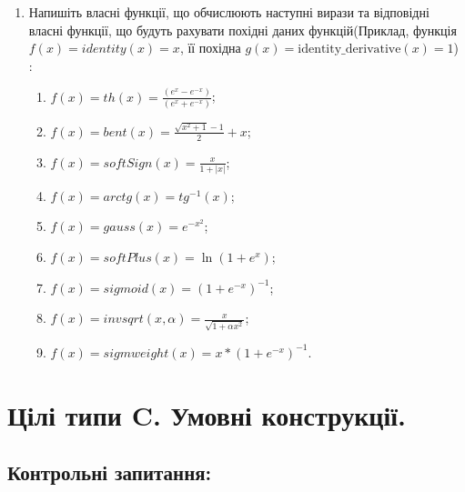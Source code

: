 \documentclass[a5paper,titlepage,openany,twoside,
]
{book_unv}%
\makeatletter
\newcommand{\xslalph}[1]{\expandafter\@xslalph\csname c@#1\endcsname}
\newcommand{\@xslalph}[1]{%
    \ifcase#1\or а\or б\or в\or г\or д\or e\or є\or ж\or з\or i%
    \or й\or к\or л\or м\or н\or о\or п\or р\or с\or т%
    \or у\or ф\or х\or ц\or ч\or ш\or ю\or я\or аа\or бб\or вв%
    \else\@ctrerr\fi%
}
\makeatother
\begin{document}
\begin{enumerate}
\item
  Напишіть власні функції, що обчислюють наступні вирази та відповідні
  власні функції, що будуть рахувати похідні даних функцій(Приклад,
  функція \(f(x) = identity(x) = x\), її похідна
  \(g(x) = \textrm{identity\_derivative}(x) = 1\)) :


  \begin{enumerate}[label=\xslalph*)]
  \item   \(f(x) = th(x) = \frac{(e^{x} - e^{-x})}{(e^{x} + e^{-x})}\);
\item \(f(x) = bent(x) = \frac{\sqrt{x^{2} + 1} - 1}{2} + x\);
\item \(f(x) = softSign(x) = \frac{x}{1 + |x|}\);
\item \(f(x) = arctg(x) = tg^{-1}(x)\);
\item\(f(x) = gauss(x) = e^{-x^{2}}\);
\item \(f(x) = softPlus(x) = \ln(1 + e^{x})\);
\item \(f(x) = sigmoid(x) = {(1 + e^{-x})}^{-1}\);
\item \(f(x) = invsqrt(x,\alpha) = \frac{x}{\sqrt{1 + \alpha x^{2}}}\);
\item\(f(x) = sigmweight(x) = x*{(1 + e^{-x})}^{-1}\).

 \end{enumerate}
\end{enumerate}


\chapter{ Цілі типи C. Умовні конструкції.}
%

\section{Контрольні запитання:}
\end{document}
